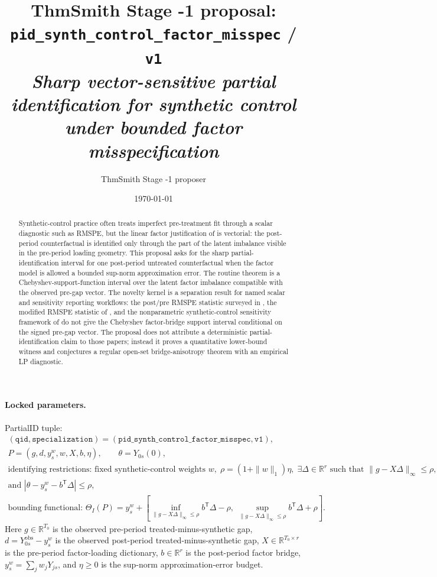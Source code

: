 \documentclass[11pt]{article}
\title{ThmSmith Stage -1 proposal: \texttt{pid\_synth\_control\_factor\_misspec} / \texttt{v1}%
  \\ \large\textit{Sharp vector-sensitive partial identification for synthetic control under bounded factor misspecification}}
\author{ThmSmith Stage -1 proposer}
\date{\today}
\newcommand{\transpose}{\mathsf{T}}
\newcommand{\R}{\mathbb{R}}
\theoremstyle{definition}
\theoremstyle{plain}
\theoremstyle{remark}
\begin{document}
\maketitle


\paragraph{Locked parameters.}
PartialID tuple:
\[
\begin{gathered}
(\texttt{qid},\texttt{specialization})
  =(\texttt{pid\_synth\_control\_factor\_misspec},\texttt{v1}),\\
P=(g,d,y_s^w,w,X,b,\eta),\qquad
\theta=Y_{0s}(0),\\
\text{identifying restrictions: fixed synthetic-control weights }w,\;
\rho=(1+\|w\|_1)\eta,\;\exists \Delta\in\R^r
\text{ such that }\|g-X\Delta\|_\infty\le \rho,\\
\text{and } |\theta-y_s^w-b^\transpose \Delta|\le \rho,\\
\text{bounding functional: }
\Theta_I(P)=y_s^w+
\left[
\inf_{\|g-X\Delta\|_\infty\le\rho}b^\transpose\Delta-\rho,\;
\sup_{\|g-X\Delta\|_\infty\le\rho}b^\transpose\Delta+\rho
\right].
\end{gathered}
\]
Here \(g\in\R^{T_0}\) is the observed pre-period treated-minus-synthetic gap, \(d=Y_{0s}^{\mathrm{obs}}-y_s^w\) is the observed post-period treated-minus-synthetic gap, \(X\in\R^{T_0\times r}\) is the pre-period factor-loading dictionary, \(b\in\R^r\) is the post-period factor bridge, \(y_s^w=\sum_j w_jY_{js}\), and \(\eta\ge0\) is the sup-norm approximation-error budget.

\begin{abstract}
Synthetic-control practice often treats imperfect pre-treatment fit through a scalar diagnostic such as RMSPE, but the linear factor justification of \citet{AbadieDiamondHainmueller2010} is vectorial: the post-period counterfactual is identified only through the part of the latent imbalance visible in the pre-period loading geometry. This proposal asks for the sharp partial-identification interval for one post-period untreated counterfactual when the factor model is allowed a bounded sup-norm approximation error. The routine theorem is a Chebyshev-support-function interval over the latent factor imbalance compatible with the observed pre-gap vector. The novelty kernel is a separation result for named scalar and sensitivity reporting workflows: the post/pre RMSPE statistic surveyed in \citet{Abadie2021}, the modified RMSPE statistic of \citet{FirpoPossebom2018}, and the nonparametric synthetic-control sensitivity framework of \citet{ZeitlerVlontzosGilliganLee2023} do not give the Chebyshev factor-bridge support interval conditional on the signed pre-gap vector. The proposal does not attribute a deterministic partial-identification claim to those papers; instead it proves a quantitative lower-bound witness and conjectures a regular open-set bridge-anisotropy theorem with an empirical LP diagnostic.
\end{abstract}
\end{document}
